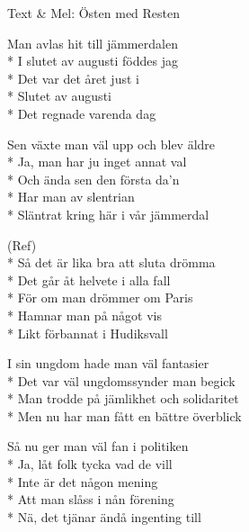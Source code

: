 \begin{SongText}[Pessemistkonsulten]
    \begin{SongInfo}
        Text \& Mel: Östen med Resten
    \end{SongInfo}
    \begin{SongVerse}
        Man avlas hit till jämmerdalen\\*%
        I slutet av augusti föddes jag\\*%
        Det var det året just i\\*%
        Slutet av augusti\\*%
        Det regnade varenda dag
    \end{SongVerse}
    \begin{SongVerse}
        Sen växte man väl upp och blev äldre\\*%
        Ja, man har ju inget annat val\\*%
        Och ända sen den första da'n\\*%
        Har man av slentrian\\*%
        Släntrat kring här i vår jämmerdal
    \end{SongVerse}
    \begin{SongVerse}
        (Ref)\\*%
        Så det är lika bra att sluta drömma\\*%
        Det går åt helvete i alla fall\\*%
        För om man drömmer om Paris\\*%
        Hamnar man på något vis\\*%
        Likt förbannat i Hudiksvall
    \end{SongVerse}
    \begin{SongVerse}
        I sin ungdom hade man väl fantasier\\*%
        Det var väl ungdomssynder man begick\\*%
        Man trodde på jämlikhet och solidaritet\\*%
        Men nu har man fått en bättre överblick
    \end{SongVerse}
    \begin{SongVerse}
        Så nu ger man väl fan i politiken\\*%
        Ja, låt folk tycka vad de vill\\*%
        Inte är det någon mening\\*%
        Att man slåss i nån förening\\*%
        Nä, det tjänar ändå ingenting till

\end{SongVerse}
\end{SongText}
